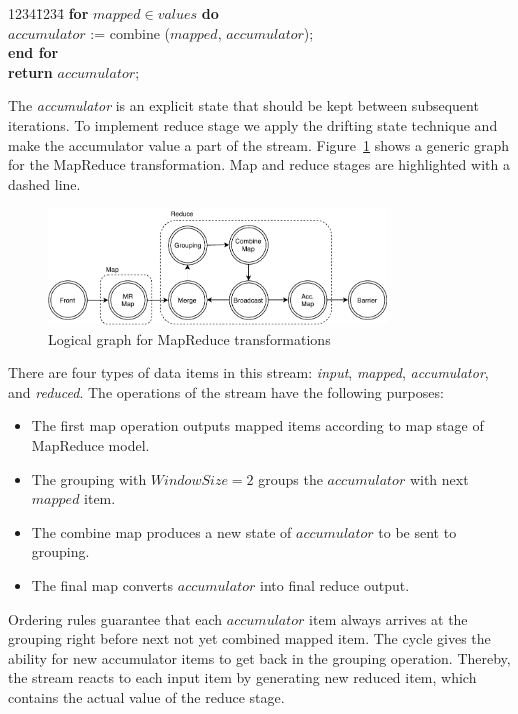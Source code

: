 \begin {tabbing}
1234\=1234\= \kill
{\bf for} $mapped \in values$ {\bf do}   \\
\>$accumulator$ := combine ($mapped$, $accumulator$); \\
{\bf end for} \\
{\bf return } $accumulator$;
\end {tabbing}

The {\it accumulator} is an explicit state that should be kept between subsequent iterations. To implement reduce stage we apply the drifting state technique and make the accumulator value a part of the stream. Figure~\ref{mapreduce-graph-figure} shows a generic graph for the MapReduce transformation. Map and reduce stages are highlighted with a dashed line. 

\begin{figure}[t]
  \centering
  \includegraphics[width=0.8\textwidth]{Chapters/DeterministicModelRuntime/pics/mapreduce}
  \caption{Logical graph for MapReduce transformations}
  \label {mapreduce-graph-figure}
\end{figure}

There are four types of data items in this stream: {\em input}, {\em mapped}, {\em accumulator}, and {\em reduced}. The operations of the stream have the following purposes:

\begin{itemize}
  \item The first map operation outputs mapped items according to map stage of MapReduce model.
  
  \item The grouping with $WindowSize=2$ groups the $accumulator$ with next $mapped$ item. 
  
  \item The combine map produces a new state of $accumulator$ to be sent to grouping.
  
  \item The final map converts $accumulator$ into final reduce output.
\end{itemize}

Ordering rules  guarantee that each $accumulator$  item always arrives at the grouping right before next not yet combined mapped item. The cycle gives the ability for new accumulator items to get back in the grouping operation. Thereby, the stream reacts to each input item by generating new reduced item, which contains the actual value of the reduce stage.

